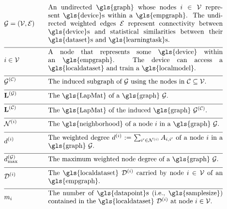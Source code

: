 \begin{align}
 	&\graph = \pair{\nodes}{\edges} & \quad & \parbox{.75\textwidth}{An undirected \gls{graph} whose nodes $\nodeidx \in \nodes$ represent 
	\gls{device}s within a \gls{empgraph}. The undirected weighted edges $\edges$ represent connectivity between 
	\gls{device}s and statistical similarities between their \gls{dataset}s and \gls{learningtask}s.}\nonumber \\[2mm] \hline \nonumber\\[-5mm]
&\nodeidx \in \nodes& \quad & \parbox{.75\textwidth}{A node that represents some 
	\gls{device} within an \gls{empgraph}. The device can access a \gls{localdataset} and train a \gls{localmodel}.}\nonumber \\[2mm] \hline \nonumber\\[-5mm]
	&\indsubgraph{\graph}{\cluster}& \quad & \parbox{.75\textwidth}{The induced subgraph of $\graph$ using the nodes in $\cluster \subseteq \nodes$.} \nonumber \\[2mm] \hline \nonumber\\[-5mm]
	&\LapMat{\graph}   & \quad & \parbox{.75\textwidth}{The \gls{LapMat} of a \gls{graph} $\graph$.}\nonumber \\[2mm] \hline \nonumber\\[-5mm]
		&\LapMat{\cluster}   & \quad & \parbox{.75\textwidth}{The \gls{LapMat} of the induced \gls{graph} $\indsubgraph{\graph}{\cluster}$.} \nonumber \\[2mm] \hline \nonumber\\[-5mm]
	 &		\neighbourhood{\nodeidx}  & \quad & \parbox{.75\textwidth}{The \gls{neighborhood} of a node $\nodeidx$ in a \gls{graph} $\graph$.}   \nonumber \\[2mm] \hline \nonumber\\[-5mm]
	&\nodedegree{\nodeidx} & \quad & \parbox{.75\textwidth}{The weighted degree $\nodedegree{\nodeidx}\defeq \sum_{\nodeidx' \in \neighbourhood{\nodeidx}} \edgeweight_{\nodeidx,\nodeidx'}$ of a node $\nodeidx$ in a \gls{graph} $\graph$.}  \nonumber \\[2mm] \hline \nonumber\\[-5mm]
	&\maxnodedegree^{(\graph)} & \quad & \parbox{.75\textwidth}{The maximum weighted node degree of a \gls{graph} $\graph$.} \nonumber \\[2mm] \hline \nonumber\\[-5mm] 
&\localdataset{\nodeidx} & \quad & \parbox{.75\textwidth}{The \gls{localdataset} $\localdataset{\nodeidx}$ carried by 
			node $\nodeidx\in \nodes$ of an \gls{empgraph}.} \nonumber \\[2mm] \hline \nonumber\\[-5mm]
&\localsamplesize{\nodeidx} & \quad & \parbox{.75\textwidth}{The number of \gls{datapoint}s (i.e., \gls{samplesize}) contained in the 
			\gls{localdataset} $\localdataset{\nodeidx}$ at node $\nodeidx\in \nodes$.} \nonumber 
\end{align} 
